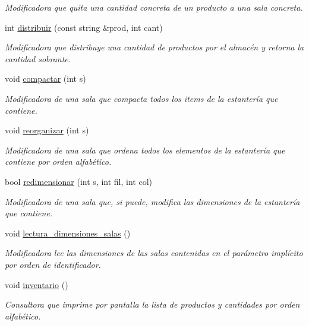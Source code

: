 \begin{DoxyCompactItemize}
\begin{DoxyCompactList}\small\item\em Modificadora que quita una cantidad concreta de un producto a una sala concreta. \end{DoxyCompactList}\item 
int \hyperlink{class_almacen_acfd635dc057df10be22e9920ecca607b}{distribuir} (const string \&prod, int cant)
\begin{DoxyCompactList}\small\item\em Modificadora que distribuye una cantidad de productos por el almacén y retorna la cantidad sobrante. \end{DoxyCompactList}\item 
void \hyperlink{class_almacen_a2e6c76cf94ab9a0a9436df2fadd71dd2}{compactar} (int s)
\begin{DoxyCompactList}\small\item\em Modificadora de una sala que compacta todos los items de la estantería que contiene. \end{DoxyCompactList}\item 
void \hyperlink{class_almacen_acb6e13d2501688e17607b4a74fb18cf8}{reorganizar} (int s)
\begin{DoxyCompactList}\small\item\em Modificadora de una sala que ordena todos los elementos de la estantería que contiene por orden alfabético. \end{DoxyCompactList}\item 
bool \hyperlink{class_almacen_a873095b67a174bc27fd473043fef2a25}{redimensionar} (int s, int fil, int col)
\begin{DoxyCompactList}\small\item\em Modificadora de una sala que, si puede, modifica las dimensiones de la estantería que contiene. \end{DoxyCompactList}\item 
void \hyperlink{class_almacen_a25ae2690b3295f66fa5798c01b7ab182}{lectura\+\_\+dimensiones\+\_\+salas} ()
\begin{DoxyCompactList}\small\item\em Modificadora lee las dimensiones de las salas contenidas en el parámetro implícito por orden de identificador. \end{DoxyCompactList}\item 
void \hyperlink{class_almacen_affa9fb3647b6cdb13184371dd9e32454}{inventario} ()
\begin{DoxyCompactList}\small\item\em Consultora que imprime por pantalla la lista de productos y cantidades por orden alfabético. \end{DoxyCompactList}\item 

\end{DoxyCompactItemize}
